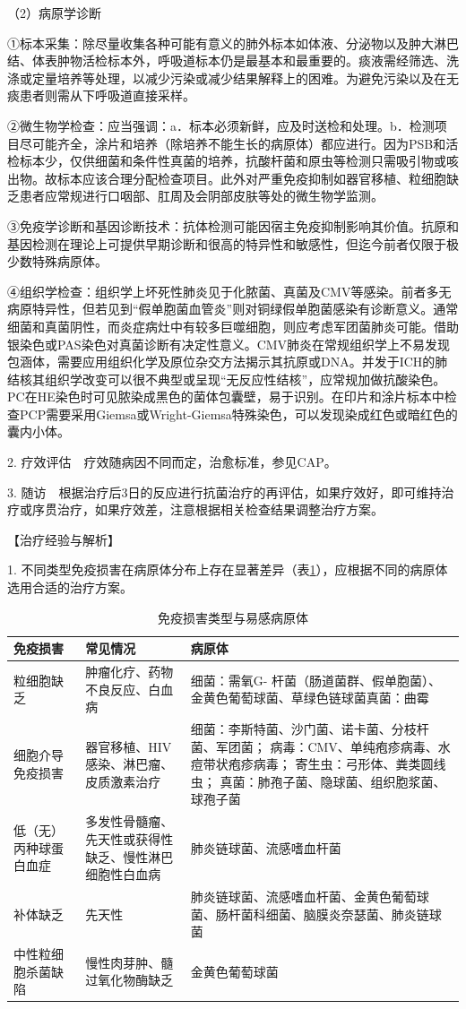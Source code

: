 （2）病原学诊断

①标本采集：除尽量收集各种可能有意义的肺外标本如体液、分泌物以及肿大淋巴结、体表肿物活检标本外，呼吸道标本仍是最基本和最重要的。痰液需经筛选、洗涤或定量培养等处理，以减少污染或减少结果解释上的困难。为避免污染以及在无痰患者则需从下呼吸道直接采样。

②微生物学检查：应当强调：a．标本必须新鲜，应及时送检和处理。b．检测项目尽可能齐全，涂片和培养（除培养不能生长的病原体）都应进行。因为PSB和活检标本少，仅供细菌和条件性真菌的培养，抗酸杆菌和原虫等检测只需吸引物或咳出物。故标本应该合理分配检查项目。此外对严重免疫抑制如器官移植、粒细胞缺乏患者应常规进行口咽部、肛周及会阴部皮肤等处的微生物学监测。

③免疫学诊断和基因诊断技术：抗体检测可能因宿主免疫抑制影响其价值。抗原和基因检测在理论上可提供早期诊断和很高的特异性和敏感性，但迄今前者仅限于极少数特殊病原体。

④组织学检查：组织学上坏死性肺炎见于化脓菌、真菌及CMV等感染。前者多无病原特异性，但若见到“假单胞菌血管炎”则对铜绿假单胞菌感染有诊断意义。通常细菌和真菌阴性，而炎症病灶中有较多巨噬细胞，则应考虑军团菌肺炎可能。借助银染色或PAS染色对真菌诊断有决定性意义。CMV肺炎在常规组织学上不易发现包涵体，需要应用组织化学及原位杂交方法揭示其抗原或DNA。并发于ICH的肺结核其组织学改变可以很不典型或呈现“无反应性结核”，应常规加做抗酸染色。PC在HE染色时可见脓染成黑色的菌体包囊壁，易于识别。在印片和涂片标本中检查PCP需要采用Giemsa或Wright-Giemsa特殊染色，可以发现染成红色或暗红色的囊内小体。

2. 疗效评估　疗效随病因不同而定，治愈标准，参见CAP。

3.
随访　根据治疗后3日的反应进行抗菌治疗的再评估，如果疗效好，即可维持治疗或序贯治疗，如果疗效差，注意根据相关检查结果调整治疗方案。

【治疗经验与解析】

1.
不同类型免疫损害在病原体分布上存在显著差异（表\ref{tab1-8-6}），应根据不同的病原体选用合适的治疗方案。

\begin{longtable}[]{p{3.6cm}p{5.7cm}p{5.7cm}}
  \caption{免疫损害类型与易感病原体}
  \label{tab1-8-6}\\
\toprule
免疫损害 & 常见情况 & 病原体\tabularnewline
\midrule
\endhead
\rowcolor{lightgray}粒细胞缺乏 & 肿瘤化疗、药物不良反应、白血病 & 细菌：需氧G{-}
杆菌（肠道菌群、假单胞菌）、金黄色葡萄球菌、草绿色链球菌真菌：曲霉\tabularnewline
细胞介导免疫损害 & 器官移植、HIV感染、淋巴瘤、皮质激素治疗 &
细菌：李斯特菌、沙门菌、诺卡菌、分枝杆菌、军团菌； 病毒：CMV、单纯疱疹病毒、水痘带状疱疹病毒； 寄生虫：弓形体、粪类圆线虫； 真菌：肺孢子菌、隐球菌、组织胞浆菌、球孢子菌\tabularnewline\rowcolor{lightgray}
低（无）丙种球蛋白血症 &
多发性骨髓瘤、先天性或获得性缺乏、慢性淋巴细胞性白血病 &
肺炎链球菌、流感嗜血杆菌\tabularnewline
补体缺乏 & 先天性 &
肺炎链球菌、流感嗜血杆菌、金黄色葡萄球菌、肠杆菌科细菌、脑膜炎奈瑟菌、肺炎链球菌\tabularnewline\rowcolor{lightgray}
中性粒细胞杀菌缺陷 & 慢性肉芽肿、髓过氧化物酶缺乏 &
金黄色葡萄球菌\tabularnewline
\bottomrule
\end{longtable}

